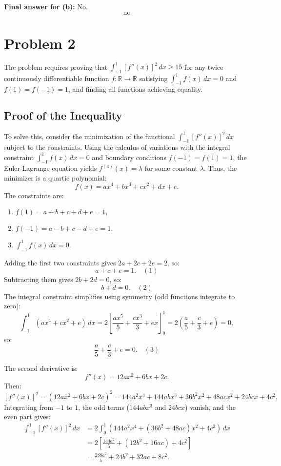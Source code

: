 \documentclass[12pt,a4paper]{article}
\theoremstyle{definition}
\begin{document}
    \textbf{Final answer for (b):} No.
    \[
        \boxed{\text{no}}
    \]

\section{Problem 2}
    The problem requires proving that $\int_{-1}^{1} [f''(x)]^2 \, dx \geq 15$ for any twice continuously differentiable function $f: \mathbb{R} \to \mathbb{R}$ satisfying $\int_{-1}^{1} f(x) \, dx = 0$ and $f(1) = f(-1) = 1$, and finding all functions achieving equality.

    \subsection*{Proof of the Inequality}
    To solve this, consider the minimization of the functional $\int_{-1}^{1} [f''(x)]^2 \, dx$ subject to the constraints. Using the calculus of variations with the integral constraint $\int_{-1}^{1} f(x) \, dx = 0$ and boundary conditions $f(-1) = f(1) = 1$, the Euler-Lagrange equation yields $f^{(4)}(x) = \lambda$ for some constant $\lambda$. Thus, the minimizer is a quartic polynomial:
    \[
        f(x) = a x^4 + b x^3 + c x^2 + d x + e.
    \]
    The constraints are:
    \begin{enumerate}
        \item $f(1) = a + b + c + d + e = 1$,
        \item $f(-1) = a - b + c - d + e = 1$,
        \item $\int_{-1}^{1} f(x) \, dx = 0$.
    \end{enumerate}

    Adding the first two constraints gives $2a + 2c + 2e = 2$, so:
    \[
        a + c + e = 1. \quad (1)
    \]
    Subtracting them gives $2b + 2d = 0$, so:
    \[
        b + d = 0. \quad (2)
    \]
    The integral constraint simplifies using symmetry (odd functions integrate to zero):
    \[
        \int_{-1}^{1} (a x^4 + c x^2 + e) \, dx = 2 \left[ \frac{a x^5}{5} + \frac{c x^3}{3} + e x \right]_0^1 = 2 \left( \frac{a}{5} + \frac{c}{3} + e \right) = 0,
    \]
    so:
    \[
        \frac{a}{5} + \frac{c}{3} + e = 0. \quad (3)
    \]

    The second derivative is:
    \[
        f''(x) = 12a x^2 + 6b x + 2c.
    \]
    Then:
    \[
        [f''(x)]^2 = (12a x^2 + 6b x + 2c)^2 = 144a^2 x^4 + 144ab x^3 + 36b^2 x^2 + 48ac x^2 + 24bc x + 4c^2.
    \]
    Integrating from $-1$ to $1$, the odd terms ($144ab x^3$ and $24bc x$) vanish, and the even part gives:
    \begin{align*}
        \int_{-1}^{1} [f''(x)]^2 \, dx &= 2 \int_0^1 (144a^2 x^4 + (36b^2 + 48ac) x^2 + 4c^2) \, dx \\
        &= 2 \left[ \frac{144a^2}{5} + (12b^2 + 16ac) + 4c^2 \right] \\
        &= \frac{288a^2}{5} + 24b^2 + 32ac + 8c^2.
    \end{align*}
\end{document}
